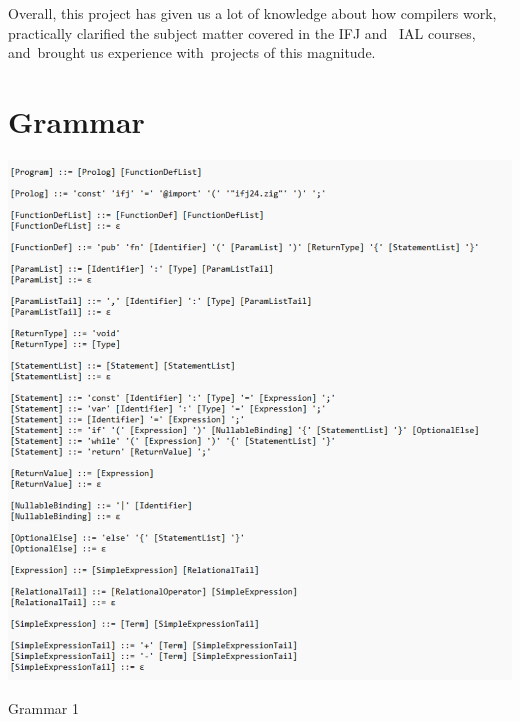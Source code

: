 \documentclass[a4paper, 11pt]{article}
\begin{document}
	Overall, this project has given us a lot of knowledge about how compilers work, practically
	clarified the subject matter covered in the IFJ and ~IAL courses, and~brought us experience with~projects of this magnitude.

	\clearpage
	\appendix



	\begin{table}[!ht]
        \section{Grammar}
		\centering
		\includegraphics[width=1\linewidth]{Grammar1.pdf}
		\caption{Grammar 1}
		\label{table:png2pdf (1).pdf}
	\end{table}
\end{document}
